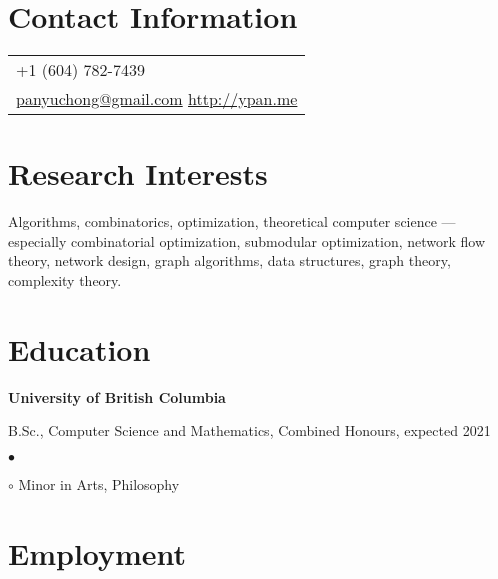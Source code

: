 \documentclass[margin,line]{res}
\newenvironment{list1}{
  \begin{list}{\ding{113}}{%
      \setlength{\itemsep}{0in}
      \setlength{\parsep}{0.025in} \setlength{\parskip}{0in}
      \setlength{\topsep}{0in} \setlength{\partopsep}{0in}
      \setlength{\leftmargin}{0.17in}}}{\end{list}}
\newenvironment{list2}{
  \begin{list}{$\bullet$}{%
      \setlength{\itemsep}{0in}
      \setlength{\parsep}{0in} \setlength{\parskip}{0in}
      \setlength{\topsep}{0in} \setlength{\partopsep}{0in}
      \setlength{\leftmargin}{0.2in}}}{\end{list}}
\begin{document}

\begin{resume}

\section{\sc Contact Information}

\vspace{.05in}
\begin{tabular}{p{2in}}
+1 (604) 782-7439 \\
\href{mailto:panyuchong@gmail.com}{panyuchong@gmail.com}
\href{http://ypan.me/}{http://ypan.me}
\end{tabular}


\section{\sc Research Interests}
Algorithms, combinatorics, optimization, theoretical computer science --- especially combinatorial optimization, submodular optimization, network flow theory, network design, graph algorithms, data structures, graph theory, complexity theory.

\section{\sc Education}

{\bf University of British Columbia}\\
\vspace*{-.1in}
\begin{list1}
\item[] B.Sc., Computer Science and Mathematics, Combined Honours, expected 2021
  \begin{list2}
  \item[$\circ$] Minor in Arts, Philosophy
  \end{list2}
\end{list1}


\section{\sc Employment}


\end{resume}
\end{document}
